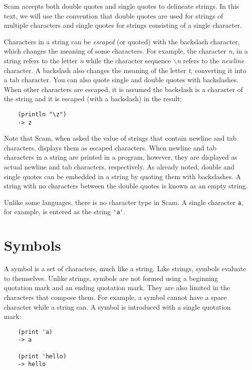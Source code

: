 Scam accepts both double quotes and single quotes to
delineate strings. In this text, we will use the convention
that double quotes are used for strings of multiple 
characters and single quotes for strings consisting of
a single character.

Characters in a string can be {\it escaped} (or quoted)
with the backslash character,
which changes the meaning of some characters. For example, the character
{\it n}, in a string refers to the letter {\it n} while the character sequence
{\it $\backslash$n}
refers
to the {\it newline} character. A backslash also changes the meaning of the
letter {\it t},
converting it into a tab character.
You can also quote single and double quotes with backslashes.
When other characters are escaped,
it is assumed the backslash is a character of the
string and it is escaped (with a backslash) in the result:

\begin{verbatim}
    (println "\z")
    -> z
\end{verbatim}

Note that Scam, when asked
the value of strings that contain newline and tab characters, displays
them as escaped characters. When newline and tab characters in a string
are printed in a program, however, they are displayed as actual newline
and tab characters, respectively.
As already noted,
double and single quotes can be embedded in a
string by quoting them with backslashes. A string with no characters
between the double quotes is known as an empty string.

Unlike some languages, there is no character type in Scam. A single
character {\verb+a+}, for example, is entered as the string
{\verb+'a'+}.

\section{Symbols}

A symbol is a set of characters, much like a string. Like strings,
symbols evaluate to themselves. Unlike strings,
symbols are not formed using a beginning quotation mark and an
ending quotation mark. They are also limited
in the characters that compose them. For example, a symbol cannot
have a space character while a string can. A symbol is introduced
with a single quotation mark:

\begin{verbatim}
    (print 'a)
    -> a

    (print 'hello)
    -> hello
\end{verbatim}

